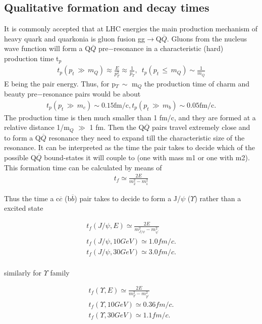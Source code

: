 \subsection{Qualitative formation and decay times}
It is commonly accepted that at LHC energies the main production mechanism
of heavy quark and quarkonia is gluon fusion gg$\rightarrow$Q$\overline{Q}$. Gluons from the
nucleus wave function will form a Q$\overline{Q}$ pre$-$resonance in a characteristic (hard)
production time t$_p$
\begin{eqnarray}
t_p(p_t\, \gg\, m_Q) \approx \frac{E}{p_T^2} \approx \frac{1}{p_T},\,\,\,
t_p(p_t\, \leq\, m_Q)\sim \frac{1}{m_Q}
\end{eqnarray}
E being the pair energy. Thus, for p$_T \,\sim$ m$_Q$ the production time of
charm and beauty pre$-$resonance pairs would be about
\begin{eqnarray}
t_p(p_t\, \gg\, m_c) \sim 0.15 \mbox{fm/c},t_p(p_t\, \gg\, m_b) \sim 0.05 \mbox{fm/c}.   
\end{eqnarray}
The production time is then much smaller than 1 fm/c, and they are
formed at a relative distance 1/m$_Q\,\,\gg$ 1 fm. Then the Q$\overline{Q}$ pairs 
travel extremely close and to form a Q$\overline{Q}$ resonance they need to expand 
till the characteristic size of the resonance. It can be interpreted as the time 
the pair takes to decide which of the possible Q$\overline{Q}$ bound-states 
it will couple to (one with mass m1 or one with m2). This formation time can be calculated 
by means of \cite{Thews, Khar_Thews}
\begin{eqnarray}
t_f \simeq \frac{2E}{m_2^2 - m_1^2}
\end{eqnarray}

Thus the time a c$\overline{c}$ (b$\overline{b}$) pair takes to decide to form a J/$\psi$
($\Upsilon$) rather than a excited state

\begin{eqnarray}
t_f(J/\psi,E) \simeq \frac{2E}{m_{J/\psi}^2 - m_{\psi^{'}}^2} \nonumber \\
t_f(J/\psi,10 GeV) \simeq 1.0 fm/c.\nonumber \\
t_f(J/\psi,30 GeV) \simeq 3.0 fm/c. \nonumber \\
\end{eqnarray}

similarly for  $\Upsilon$ family

\begin{eqnarray}
t_f(\Upsilon,E) \simeq \frac{2E}{m_{\Upsilon}^2 - m_{\Upsilon^{'}}^2} \nonumber \\
t_f(\Upsilon,10 GeV) \simeq 0.36 fm/c.\nonumber \\
t_f(\Upsilon,30 GeV) \simeq 1.1 fm/c. \nonumber \\
\end{eqnarray}

